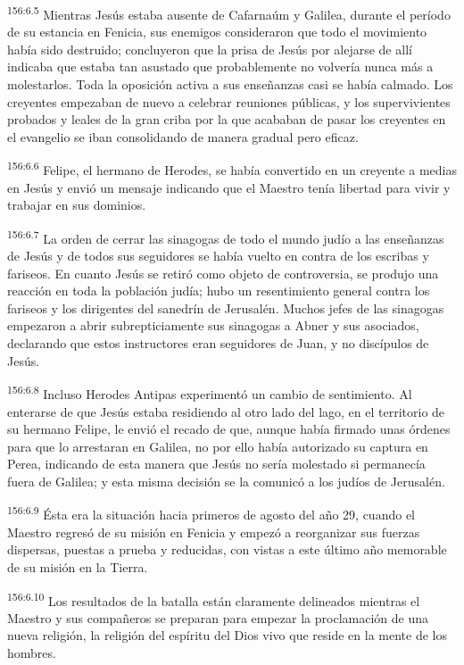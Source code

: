 \par
\textsuperscript{156:6.5} Mientras Jesús estaba ausente de Cafarnaúm y Galilea, durante el período de su estancia en Fenicia, sus enemigos consideraron que todo el movimiento había sido destruido; concluyeron que la prisa de Jesús por alejarse de allí indicaba que estaba tan asustado que probablemente no volvería nunca más a molestarlos. Toda la oposición activa a sus enseñanzas casi se había calmado. Los creyentes empezaban de nuevo a celebrar reuniones públicas, y los supervivientes probados y leales de la gran criba por la que acababan de pasar los creyentes en el evangelio se iban consolidando de manera gradual pero eficaz.

\par
\textsuperscript{156:6.6} Felipe, el hermano de Herodes, se había convertido en un creyente a medias en Jesús y envió un mensaje indicando que el Maestro tenía libertad para vivir y trabajar en sus dominios.

\par
\textsuperscript{156:6.7} La orden de cerrar las sinagogas de todo el mundo judío a las enseñanzas de Jesús y de todos sus seguidores se había vuelto en contra de los escribas y fariseos. En cuanto Jesús se retiró como objeto de controversia, se produjo una reacción en toda la población judía; hubo un resentimiento general contra los fariseos y los dirigentes del sanedrín de Jerusalén. Muchos jefes de las sinagogas empezaron a abrir subrepticiamente sus sinagogas a Abner y sus asociados, declarando que estos instructores eran seguidores de Juan, y no discípulos de Jesús.

\par
\textsuperscript{156:6.8} Incluso Herodes Antipas experimentó un cambio de sentimiento. Al enterarse de que Jesús estaba residiendo al otro lado del lago, en el territorio de su hermano Felipe, le envió el recado de que, aunque había firmado unas órdenes para que lo arrestaran en Galilea, no por ello había autorizado su captura en Perea, indicando de esta manera que Jesús no sería molestado si permanecía fuera de Galilea; y esta misma decisión se la comunicó a los judíos de Jerusalén.

\par
\textsuperscript{156:6.9} Ésta era la situación hacia primeros de agosto del año 29, cuando el Maestro regresó de su misión en Fenicia y empezó a reorganizar sus fuerzas dispersas, puestas a prueba y reducidas, con vistas a este último año memorable de su misión en la Tierra.

\par
\textsuperscript{156:6.10} Los resultados de la batalla están claramente delineados mientras el Maestro y sus compañeros se preparan para empezar la proclamación de una nueva religión, la religión del espíritu del Dios vivo que reside en la mente de los hombres.